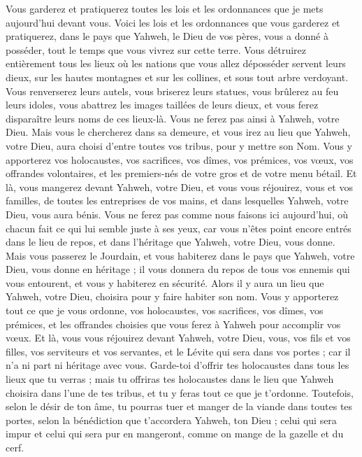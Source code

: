 \begin{multicols}{2}
Vous garderez et pratiquerez toutes les lois et les ordonnances que je mets aujourd'hui devant vous.
\VerseOne{}Voici les lois et les ordonnances que vous garderez et pratiquerez, dans le pays que Yahweh, le Dieu de vos pères, vous a donné à posséder, tout le temps que vous vivrez sur cette terre.
Vous détruirez entièrement tous les lieux où les nations que vous allez déposséder servent leurs dieux, sur les hautes montagnes et sur les collines, et sous tout arbre verdoyant.
Vous renverserez leurs autels, vous briserez leurs statues, vous brûlerez au feu leurs idoles\FTNT{}, vous abattrez les images taillées de leurs dieux, et vous ferez disparaître leurs noms de ces lieux-là.
Vous ne ferez pas ainsi à Yahweh, votre Dieu.
Mais vous le chercherez dans sa demeure, et vous irez au lieu que Yahweh, votre Dieu, aura choisi d'entre toutes vos tribus, pour y mettre son Nom.
Vous y apporterez vos holocaustes, vos sacrifices, vos dîmes, vos prémices, vos vœux, vos offrandes volontaires, et les premiers-nés de votre gros et de votre menu bétail.
Et là, vous mangerez devant Yahweh, votre Dieu, et vous vous réjouirez, vous et vos familles, de toutes les entreprises de vos mains, et dans lesquelles Yahweh, votre Dieu, vous aura bénis.
Vous ne ferez pas comme nous faisons ici aujourd'hui, où chacun fait ce qui lui semble juste à ses yeux,
car vous n'êtes point encore entrés dans le lieu de repos, et dans l'héritage que Yahweh, votre Dieu, vous donne.
Mais vous passerez le Jourdain, et vous habiterez dans le pays que Yahweh, votre Dieu, vous donne en héritage ; il vous donnera du repos de tous vos ennemis qui vous entourent, et vous y habiterez en sécurité.
Alors il y aura un lieu que Yahweh, votre Dieu, choisira pour y faire habiter son nom. Vous y apporterez tout ce que je vous ordonne, vos holocaustes, vos sacrifices, vos dîmes, vos prémices, et les offrandes choisies que vous ferez à Yahweh pour accomplir vos vœux.
Et là, vous vous réjouirez devant Yahweh, votre Dieu, vous, vos fils et vos filles, vos serviteurs et vos servantes, et le Lévite qui sera dans vos portes ; car il n'a ni part ni héritage avec vous.
Garde-toi d’offrir tes holocaustes dans tous les lieux que tu verras ;
mais tu offriras tes holocaustes dans le lieu que Yahweh choisira dans l'une de tes tribus, et tu y feras tout ce que je t’ordonne.
Toutefois, selon le désir de ton âme, tu pourras tuer et manger de la viande dans toutes tes portes, selon la bénédiction que t’accordera Yahweh, ton Dieu ; celui qui sera impur et celui qui sera pur en mangeront, comme on mange de la gazelle et du cerf.

\end{multicols}
